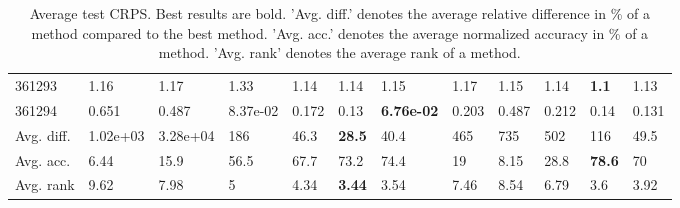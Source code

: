 \begin{table}[ht!]
\begin{tabular}{llllllllllll}
  361293 & 1.16 & 1.17 & 1.33 & 1.14 & 1.14 & 1.15 & 1.17 & 1.15 & 1.14 & \textbf{1.1} & 1.13 \\ 
  361294 & 0.651 & 0.487 & 8.37e-02 & 0.172 & 0.13 & \textbf{6.76e-02} & 0.203 & 0.487 & 0.212 & 0.14 & 0.131 \\ 
   \hline
Avg. diff. & 1.02e+03 & 3.28e+04 & 186 & 46.3 & \textbf{28.5} & 40.4 & 465 & 735 & 502 & 116 & 49.5 \\ 
  Avg. acc. & 6.44 & 15.9 & 56.5 & 67.7 & 73.2 & 74.4 & 19 & 8.15 & 28.8 & \textbf{78.6} & 70 \\ 
  Avg. rank & 9.62 & 7.98 & 5 & 4.34 & \textbf{3.44} & 3.54 & 7.46 & 8.54 & 6.79 & 3.6 & 3.92 \\ 
   \hline
\hline
\end{tabular}
\endgroup
\caption{Average test CRPS. 
                  Best results are bold. 
                  'Avg. diff.' denotes the average relative difference in \% of a method compared to the best method.
                  'Avg. acc.' denotes the average normalized accuracy in \% of a method.
                  'Avg. rank' denotes the average rank of a method.} 
\label{TABLES/table_results_CRPS}
\end{table}
